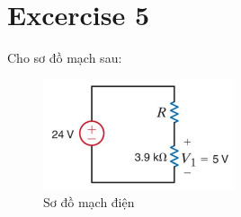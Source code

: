 \section{Excercise 5}
Cho sơ đồ mạch sau:
\begin{figure}[!htbp]
    \centering
    \includegraphics[width=0.5\textwidth]{graphics/ex5/f1.PNG}
    \caption{Sơ đồ mạch điện}
\end{figure}

